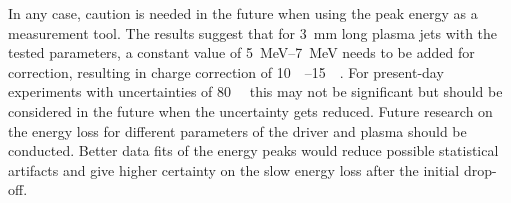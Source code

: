 \documentclass[bachelor_thesis]{subfiles}
\begin{document}
In any case, caution is needed in the future when using the peak energy as a measurement tool. The results suggest that for \qty{3}{\mm} long plasma jets with the tested parameters, a constant value of \qtyrange{5}{7}{\MeV} needs to be added for correction, resulting in charge correction of \qtyrange{10}{15}{\pico \C}.
For present-day experiments with uncertainties of \qty{80}{\pico \C} \cite{Schoebel2022} this may not be significant but should be considered in the future when the uncertainty gets reduced. 
Future research on the energy loss for different parameters of the driver and plasma should be conducted. Better data fits of the energy peaks would reduce possible statistical artifacts and give higher certainty on the slow energy loss after the initial drop-off.
\end{document}
